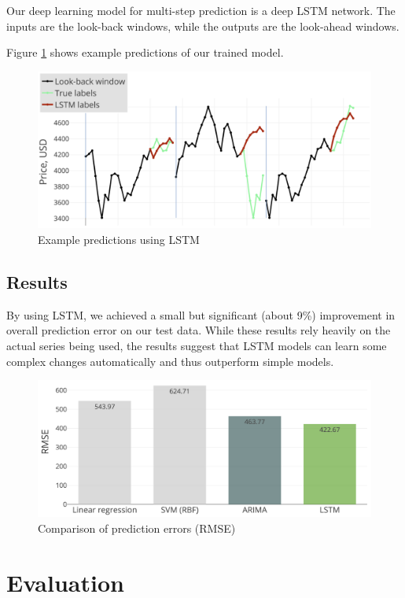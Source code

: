 \documentclass{article}
\begin{document}
Our deep learning model for multi-step prediction is a deep LSTM network. The inputs are the look-back windows, while the outputs are the look-ahead windows.

Figure \ref{fig:multi-lstm} shows example predictions of our trained model.

\begin{figure}[h!]
\centering
\includegraphics[width=0.9\columnwidth]{images/multi-lstm.png}
\caption{Example predictions using LSTM}
\label{fig:multi-lstm}
\end{figure}

\subsection{Results}

By using LSTM, we achieved a small but significant (about 9\%) improvement in overall prediction error on our test data. While these results rely heavily on the actual series being used, the results suggest that LSTM models can learn some complex changes automatically and thus outperform simple models.

\begin{figure}
\centering
\includegraphics[width=0.8\columnwidth]{images/multi-rmse.png}
\caption{Comparison of prediction errors (RMSE)}
\label{fig:multi-rmse}
\end{figure}


\section{Evaluation}
\label{sec:eval}
\end{document}
